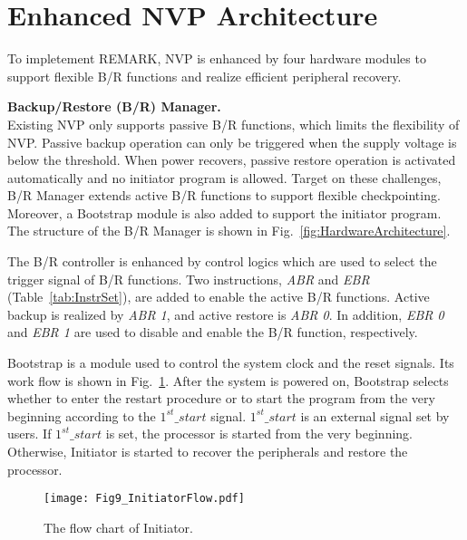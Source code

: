 \section{Enhanced NVP Architecture} \label{sec:hardware}
%
To impletement REMARK, NVP is enhanced by four hardware modules to support flexible B/R functions and realize efficient peripheral recovery.

\vspace{5pt}
\noindent\textbf{Backup/Restore (B/R) Manager.} \\
Existing NVP only supports passive B/R functions, which limits the flexibility of NVP.
Passive backup operation can only be triggered when the supply voltage is below the threshold.
When power recovers, passive restore operation is activated automatically and no initiator program is allowed. 
Target on these challenges, B/R Manager extends active B/R functions to support flexible checkpointing.
Moreover, a Bootstrap module is also added to support the initiator program.
The structure of the B/R Manager is shown in Fig.~\ref{fig:HardwareArchitecture}.

%
The B/R controller is enhanced by control logics which are used to select the trigger signal of B/R functions.
Two instructions, \emph{ABR} and \emph{EBR} (Table~\ref{tab:InstrSet}), are added to enable the active B/R functions.
Active backup is realized by \emph{ABR 1}, and active restore is \emph{ABR 0}.
In addition, \emph{EBR 0} and \emph{EBR 1} are used to disable and enable the B/R function, respectively.

%
Bootstrap is a module used to control the system clock and the reset signals.
Its work flow is shown in Fig.~\ref{fig:InitiatorFlow}.
After the system is powered on, Bootstrap selects whether to enter the restart procedure or to start the program from the very beginning according to the \emph{$1^{st}\_start$} signal.
\emph{$1^{st}\_start$} is an external signal set by users.
If \emph{$1^{st}\_start$} is set, the processor is started from the very beginning.
Otherwise, Initiator is started to recover the peripherals and restore the processor.

%
\begin{figure}[t]
    \centering
    \texttt{[image: Fig9\_InitiatorFlow.pdf]}
    \vspace{-10pt}
    \caption{The flow chart of Initiator.}
    \label{fig:InitiatorFlow}
\end{figure}

